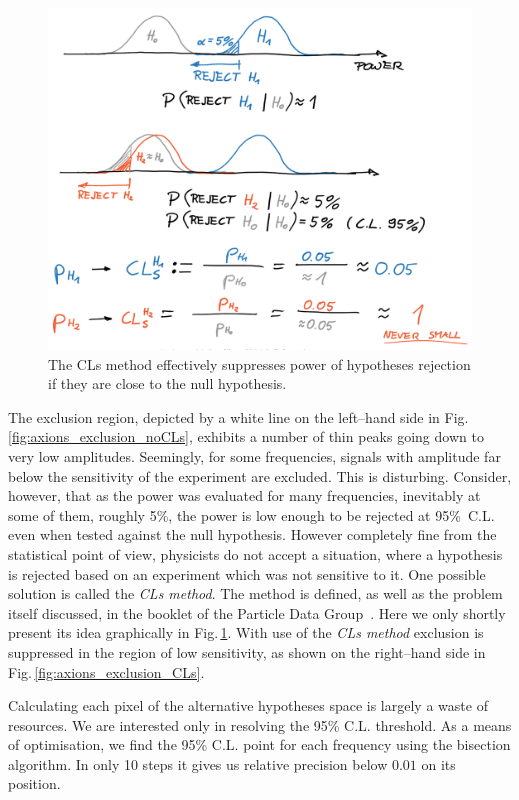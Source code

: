 \begin{figure}
  \centering \includegraphics[width=\linewidth]{gfx/axions/CLs.png}
  \caption{The CLs method effectively suppresses power of hypotheses rejection if they are close to the null hypothesis.}
  \label{fig:CLs}
\end{figure}


The exclusion region, depicted by a white line on the left--hand side in Fig.\,\ref{fig:axions_exclusion_noCLs}, exhibits a number of thin peaks going down to very low amplitudes. Seemingly, for some frequencies, signals with amplitude far below the sensitivity of the experiment are excluded. This is disturbing. Consider, however, that as the power was evaluated for many frequencies, inevitably at some of them, roughly 5\%, the power is low enough to be rejected at 95\%~C.L. even when tested against the null hypothesis. However completely fine from the statistical point of view, physicists do not accept a situation, where a hypothesis is rejected based on an experiment which was not sensitive to it. One possible solution is called the \emph{CLs method}. The method is defined, as well as the problem itself discussed, in the booklet of the Particle Data Group~\citep{PDG2016}. Here we only shortly present its idea graphically in Fig.\,\ref{fig:CLs}. With use of the \emph{CLs method} exclusion is suppressed in the region of low sensitivity, as shown on the right--hand side in Fig.\,\ref{fig:axions_exclusion_CLs}.

Calculating each pixel of the alternative hypotheses space is largely a waste of resources. We are interested only in resolving the 95\% C.L. threshold. As a means of optimisation, we find the 95\% C.L. point for each frequency using the bisection algorithm. In only 10 steps it gives us relative precision below $0.01$ on its position.

